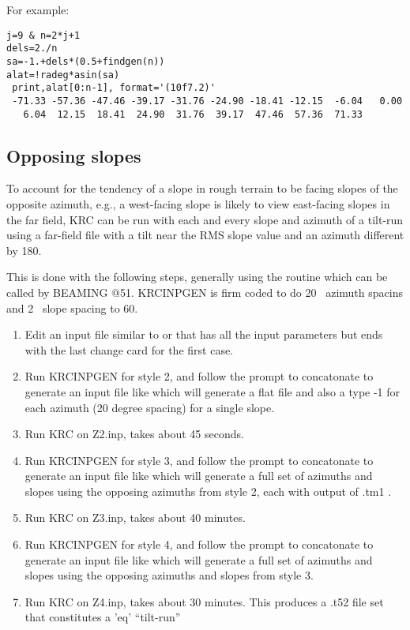 \documentclass{article}
\begin{document}
 For example:
\begin{verbatim}
j=9 & n=2*j+1
dels=2./n
sa=-1.+dels*(0.5+findgen(n))
alat=!radeg*asin(sa)
 print,alat[0:n-1], format='(10f7.2)'
 -71.33 -57.36 -47.46 -39.17 -31.76 -24.90 -18.41 -12.15  -6.04   0.00
   6.04  12.15  18.41  24.90  31.76  39.17  47.46  57.36  71.33  
\end{verbatim}
\subsection{Opposing slopes}
 To account for the tendency of a slope in rough terrain to be facing slopes of
 the opposite azimuth, e.g., a west-facing slope  is likely to view
 east-facing slopes in the far field, KRC can be run with each and every
 slope and azimuth of a tilt-run using a far-field file with a tilt near the RMS
 slope value and an azimuth different by 180\qd.

This is done with the following steps, generally using the routine
 which can be called by BEAMING @51. KRCINPGEN is firm coded
to do 20\qd~ azimuth spacins and 2\qd~ slope spacing to 60\qd.
\begin{enumerate} %

\item Edit an input file similar to  or  that has all
  the input parameters but ends with the last change card for the first case.

\item Run KRCINPGEN for style 2, and follow the prompt to concatonate to
  generate an input file like  which will generate a flat file and
  also a type -1 for each azimuth (20 degree spacing) for a single slope.

\item Run KRC on Z2.inp, takes about 45 seconds.

\item Run KRCINPGEN for style 3, and follow the prompt to concatonate to
  generate an input file like  which will generate a full set of azimuths and slopes using the opposing azimuths from style 2, each with output of .tm1 .

\item Run KRC on Z3.inp, takes about  40 minutes.

\item Run KRCINPGEN for style 4, and follow the prompt to concatonate to
  generate an input file like  which will generate a full set of azimuths and slopes using the opposing azimuths and slopes from style 3.

\item Run KRC on Z4.inp, takes about 30 minutes. This produces a .t52 file set that constitutes a  'eq'  ``tilt-run'' 

\end{enumerate} 
\end{document}
